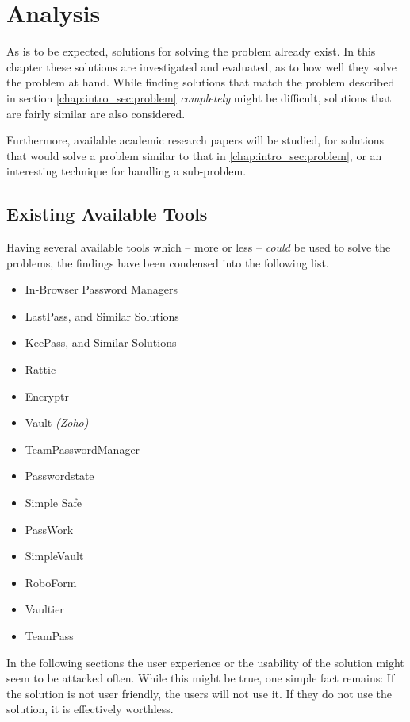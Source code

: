 \chapter{Analysis}
\label{chap:analysis}
	As is to be expected, solutions for solving the problem already exist. In this chapter these solutions are investigated and evaluated, as to how well they solve the problem at hand. While finding solutions that match the problem described in section \ref{chap:intro_sec:problem} \emph{completely} might be difficult, solutions that are fairly similar are also considered.

	Furthermore, available academic research papers will be studied, for solutions that would solve a problem similar to that in \ref{chap:intro_sec:problem}, or an interesting technique for handling a sub-problem.

	\section{Existing Available Tools}
		Having several available tools which -- more or less -- \emph{could} be used to solve the problems, the findings have been condensed into the following list.
		\begin{itemize}
			\item In-Browser Password Managers
			\item LastPass, and Similar Solutions
			\item KeePass, and Similar Solutions
			\item Rattic
			\item Encryptr
			\item Vault \emph{(Zoho)}
			\item TeamPasswordManager
			\item Passwordstate
			\item Simple Safe
			\item PassWork
			\item SimpleVault
			\item RoboForm
			\item Vaultier
			\item TeamPass 
		\end{itemize}
		In the following sections the user experience or the usability of the solution might seem to be attacked often. While this might be true, one simple fact remains: If the solution is not user friendly, the users will not use it. If they do not use the solution, it is effectively worthless.

